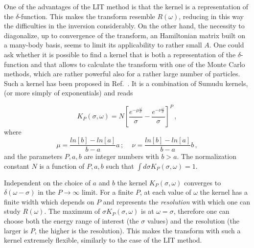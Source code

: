 One of the advantages of the LIT method is that the kernel is a representation of the $\delta$-function. This  makes 
the transform resemble
$R(\omega)$, reducing in this way the difficulties in the inversion considerably. On the other hand, 
the necessity to diagonalize, up to convergence of the transform, 
an Hamiltonian matrix built on a many-body basis, seems to limit its applicability to rather small $A$. One could ask whether it is possible 
to find a kernel that is both a representation of the $\delta$-function and that allows to calculate the transform with one of the 
Monte Carlo methods, which are rather powerful also for a rather large number of particles. 
Such a  kernel has been proposed in Ref.~\cite{Roggero_2013}. 
It is a combination of Sumudu kernels, (or more simply of exponentials) and reads

\begin{equation}
\label{eq:NEW4}
K_P(\sigma,\omega)=N\left[ \frac{e^{-\mu\frac{\omega}{\sigma}}}{\sigma}-\frac{e^{-\nu\frac{\omega}{\sigma}}}{\sigma} \right]^P\,,
\end{equation}
where 
\begin{equation}
\mu=\frac{ln[b]-ln[a]}{b-a}a\,;\,\,\,\,\,\,\,
\nu=\frac{ln[b]-ln[a]}{b-a}b\,,
\end{equation}
and the parameters $P,a,b$ are integer numbers  with $b>a$. The normalization constant $N$ is a function of $P,a,b$
such that $\int d\sigma K_P(\sigma,\omega)=1$.

Independent on the choice of $a$ and $b$ the kernel $K_P(\sigma,\omega)$ converges to 
$\delta(\omega-\sigma)$ in the $P \to \infty$ limit. 
For a finite $P$, at each value of $\omega$ the kernel has a 
finite width which depends on $P$ and  represents the {\it resolution} with which one can study
$R(\omega)$. The maximum of $\sigma K_P(\sigma,\omega)$ is at $\omega=\sigma$, 
therefore one can choose both the energy range 
of interest (the $\sigma$ values) and the resolution (the larger is $P$, the  higher is the resolution). 
This makes the transform with such a kernel  extremely flexible, similarly to the case of the LIT method.

